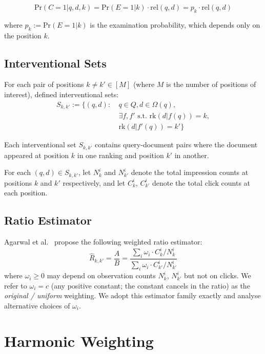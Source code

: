 \documentclass[sigconf]{acmart}
\begin{document}
\begin{equation}
\mathrm{Pr}(C = 1|q,d,k) = \mathrm{Pr}(E = 1|k) \cdot \textrm{rel}(q,d) = p_k \cdot \textrm{rel}(q,d)
\end{equation}

where $p_k := \mathrm{Pr}(E = 1|k)$ is the examination probability, which depends only on the position $k$.


\subsection{Interventional Sets}
\label{sec:intervention-harvesting}

For each pair of positions $k \neq k' \in [M]$ (where $M$ is the number of positions of interest), \cite{agarwal2019estimating} defined interventional sets:
\begin{align*}
S_{k,k'} := \{(q,d) :\ & q \in Q, d \in \Omega(q),\\
& \exists f,f' \textrm{ s.t. } \textrm{rk}(d|f(q))=k,\\
& \textrm{rk}(d|f'(q))=k'\}
\end{align*}

Each interventional set $S_{k,k'}$ contains query-document pairs where the document appeared at position $k$ in one ranking and position $k'$ in another.

For each $(q,d) \in S_{k,k'}$, let $N_k^i$ and $N_{k'}^i$ denote the total impression counts at positions $k$ and $k'$ respectively, and let $C_k^i$, $C_{k'}^i$ denote the total click counts at each position.

\subsection{Ratio Estimator}
\label{sec:ratio-estimator}

Agarwal et al.~\cite{agarwal2019estimating} propose the following weighted ratio estimator:
\begin{equation}
\hat{R}_{k,k'} = \frac{A}{B} = \frac{\sum_i \omega_i \cdot C_k^i / N_k^i}{\sum_i \omega_i \cdot C_{k'}^i / N_{k'}^i}
\end{equation}
where $\omega_i \geq 0$ may depend on observation counts $N_k^i$, $N_{k'}^i$ but not on clicks.
We refer to $\omega_i = c$ (any positive constant; the constant cancels in the ratio) as the
\emph{original / uniform} weighting. We adopt this estimator family exactly and analyse alternative
choices of $\omega_i$.

\section{Harmonic Weighting}
\label{sec:harmonic_weight}
\end{document}
